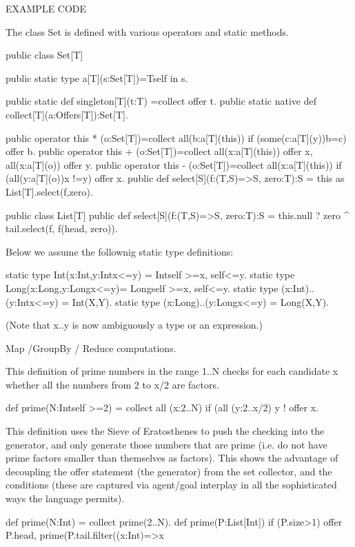 EXAMPLE CODE

The class Set is defined with various operators and static methods.

public class Set[T] {
  public static type a[T](s:Set[T])=T{self in s}.

  public static def singleton[T](t:T)                    =collect offer t.
  public static native def collect[T](a:Offers[T]):Set[T].

  public operator this * (o:Set[T])=collect all(b:a[T](this)) if (some(c:a[T](y))b=c) offer b.
  public operator this + (o:Set[T])=collect {all(x:a[T](this)) offer x, all(x:a[T](o)) offer y}.
  public operator this - (o:Set[T])=collect all(x:a[T](this)) if (all(y:a[T](o))x !=y) offer x.
  public def select[S](f:(T,S)=>S, zero:T):S = this as List[T].select(f,zero).

}

public class List[T] {
   public def select[S](f:(T,S)=>S, zero:T):S =
      this.null ? zero ^ tail.select(f, f(head, zero)).
}

Below we assume the follownig static type definitions:

   static type Int(x:Int,y:Int{x<=y})   = Int{self >=x, self<=y}.
   static type Long(x:Long,y:Long{x<=y})= Long{self >=x, self<=y}.
   static type (x:Int)..(y:Int{x<=y})   = Int(X,Y).
   static type (x:Long)..(y:Long{x<=y}) = Long(X,Y).

(Note that x..y is now ambiguously a type or an expression.)
   
Map /GroupBy / Reduce computations.



This definition of prime numbers in the range 1..N checks for each candidate x whether
all the numbers from 2 to x/2 are factors. 

def prime(N:Int{self >=2}) = 
   collect all (x:2..N)
            if (all (y:2..x/2) y !%
              offer x.


This definition uses the Sieve of Eratosthenes to push the checking into the generator,
and only generate those numbers that are prime (i.e. do not have prime factors smaller
than themselves as factors). This shows the advantage of decoupling 
the offer statement (the generator) from the set collector, and the conditions
(these are captured via agent/goal interplay in all the sophisticated ways the 
language permits).

def prime(N:Int) = collect prime(2..N).
def prime(P:List[Int]) {
  if (P.size>1) {
    offer P.head, 
    prime(P.tail.filter((x:Int)=>x%
  }
}

